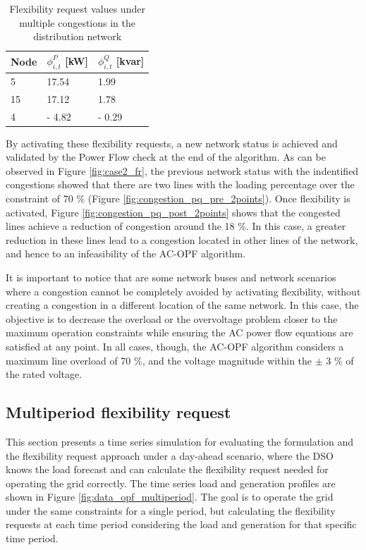 \begin{table}[htbp]
\centering
\caption{Flexibility request values under multiple congestions in the distribution network}
\label{tab:FR_case2}
\begin{tabular}{lll} 
\toprule
Node & $\phi_{i,t}^{P}$ [kW] & $\phi_{i,t}^{Q}$ [kvar]  \\ 
\hline
5    & 17.54      & 1.99         \\
15    & 17.12      & 1.78          \\
4    & - 4.82      & - 0.29         \\
\bottomrule
\end{tabular}
\end{table}

By activating these flexibility requests, a new network status is achieved and validated by the Power Flow check at the end of the algorithm. As can be observed in Figure \ref{fig:case2_fr}, the previous network status with the indentified congestions showed that there are two lines with the loading percentage over the constraint of 70 \% (Figure \ref{fig:congestion_pq_pre_2points}). Once flexibility is activated, Figure \ref{fig:congestion_pq_post_2points} shows that the congested lines achieve a reduction of congestion around the 18 \%. In this case, a greater reduction in these lines lead to a congestion located in other lines of the network, and hence to an infeasibility of the AC-OPF algorithm. 


It is important to notice that are some network buses and network scenarios where a congestion cannot be completely avoided by activating flexibility, without creating a congestion in a different location of the same network. In this case, the objective is to decrease the overload or the overvoltage problem closer to the maximum operation constraints while ensuring the AC power flow equations are satisfied at any point. In all cases, though, the AC-OPF algorithm considers a maximum line overload of 70 \%, and the voltage magnitude within the $\pm$ 3 \% of the rated voltage. 

\subsection{Multiperiod flexibility request}
This section presents a time series simulation for evaluating the formulation and the flexibility request approach under a day-ahead scenario, where the DSO knows the load forecast and can calculate the flexibility request needed for operating the grid correctly. The time series load and generation profiles are shown in Figure \ref{fig:data_opf_multiperiod}. The goal is to operate the grid under the same constraints for a single period, but calculating the flexibility requests at each time period considering the load and generation for that specific time period. 

